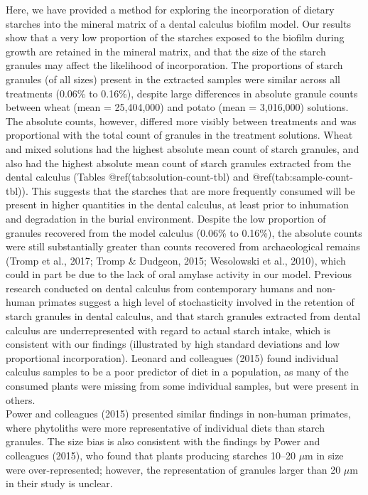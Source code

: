 \documentclass[
  letterpaper,
]{book}
\begin{document}
Here, we have provided a method for exploring the incorporation of
dietary starches into the mineral matrix of a dental calculus biofilm
model. Our results show that a very low proportion of the starches
exposed to the biofilm during growth are retained in the mineral matrix,
and that the size of the starch granules may affect the likelihood of
incorporation. The proportions of starch granules (of all sizes) present
in the extracted samples were similar across all treatments (0.06\% to
0.16\%), despite large differences in absolute granule counts between
wheat (mean = 25,404,000) and potato (mean = 3,016,000) solutions.\\
The absolute counts, however, differed more visibly between treatments
and was proportional with the total count of granules in the treatment
solutions. Wheat and mixed solutions had the highest absolute mean count
of starch granules, and also had the highest absolute mean count of
starch granules extracted from the dental calculus (Tables
@ref(tab:solution-count-tbl) and @ref(tab:sample-count-tbl)). This
suggests that the starches that are more frequently consumed will be
present in higher quantities in the dental calculus, at least prior to
inhumation and degradation in the burial environment. Despite the low
proportion of granules recovered from the model calculus (0.06\% to
0.16\%), the absolute counts were still substantially greater than
counts recovered from archaeological remains (Tromp et al., 2017; Tromp
\& Dudgeon, 2015; Wesolowski et al., 2010), which could in part be due
to the lack of oral amylase activity in our model. Previous research
conducted on dental calculus from contemporary humans and non-human
primates suggest a high level of stochasticity involved in the retention
of starch granules in dental calculus, and that starch granules
extracted from dental calculus are underrepresented with regard to
actual starch intake, which is consistent with our findings (illustrated
by high standard deviations and low proportional incorporation). Leonard
and colleagues (2015) found individual calculus samples to be a poor
predictor of diet in a population, as many of the consumed plants were
missing from some individual samples, but were present in others.\\
Power and colleagues (2015) presented similar findings in non-human
primates, where phytoliths were more representative of individual diets
than starch granules. The size bias is also consistent with the findings
by Power and colleagues (2015), who found that plants producing starches
10--20 \(\mu\)m in size were over-represented; however, the
representation of granules larger than 20 \(\mu\)m in their study is
unclear.
\end{document}
